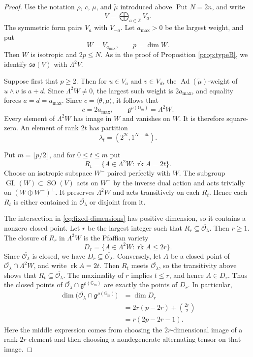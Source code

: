 \documentclass[10pt,a4paper]{amsart}
\DeclareMathOperator{\rk}{rk}
\newcommand{\Gm}{\mathbb G_m}
\begin{document}
\begin{proof}
Use the notation $\rho$, $c$, $\mu$, and $\widetilde{\mu}$ introduced
above. Put $N=2n$, and write
\[
V=\bigoplus_{a\in\mathbb Z}V_a.
\]
The symmetric form pairs $V_a$ with $V_{-a}$. Let $a_{\max}>0$ be the
largest weight, and put
\[
W=V_{a_{\max}},\qquad p=\dim W.
\]
Then $W$ is isotropic and $2p\leq N$. As in the proof of Proposition
\ref{prop:typeB}, we identify $\mathfrak{so}(V)$ with $\Lambda^2V$.

Suppose first that $p\geq2$. Then
for $u\in V_a$ and $v\in V_d$, the
$\operatorname{Ad}(\widetilde\mu)$-weight of $u\wedge v$ is $a+d$.
Since $\Lambda^2W\ne0$, the largest such weight is
$2a_{\max}$, and equality forces $a=d=a_{\max}$.
Since $c=\langle\theta,\mu\rangle$, it follows that
\[
c=2a_{\max},
\qquad
\mathfrak g^{\rho(\Gm)}=\Lambda^2W.
\]
Every element of $\Lambda^2W$ has image in $W$ and vanishes on $W$.
It is therefore square-zero. An element of rank $2t$ has partition
\[
\lambda_t=(2^{2t},1^{N-4t}).
\]

Put $m=\lfloor p/2\rfloor$, and for $0\leq t\leq m$ put
\[
R_t=\{A\in\Lambda^2W:\rk A=2t\}.
\]
Choose an isotropic subspace $W^-$ paired perfectly with $W$.
The subgroup $\operatorname{GL}(W)\subset\operatorname{SO}(V)$ acts
on $W^-$ by the inverse dual action and acts trivially on
$(W\oplus W^-)^\perp$. It preserves $\Lambda^2W$ and acts
transitively on each $R_t$. Hence each $R_t$ is either contained in
$\overline{\mathcal O_\lambda}$ or disjoint from it.

The intersection in \eqref{eq:fixed-dimensions} has positive
dimension, so it contains a nonzero closed point. Let $r$ be the
largest integer such that
$R_r\subseteq\overline{\mathcal O_\lambda}$. Then $r\geq1$.
The closure of $R_r$ in $\Lambda^2W$ is the Pfaffian variety
\[
D_r=\{A\in\Lambda^2W:\rk A\leq2r\}.
\]
Since $\overline{\mathcal O_\lambda}$ is closed, we have
$D_r\subseteq\overline{\mathcal O_\lambda}$. Conversely, let
$A$ be a closed point of
$\overline{\mathcal O_\lambda}\cap\Lambda^2W$, and write
$\rk A=2t$. Then $R_t$ meets $\overline{\mathcal O_\lambda}$, so the
transitivity above shows that
$R_t\subseteq\overline{\mathcal O_\lambda}$. The maximality of $r$
implies $t\leq r$, and hence $A\in D_r$. Thus the closed points of
$\overline{\mathcal O_\lambda}\cap\mathfrak g^{\rho(\Gm)}$ are
exactly the points of $D_r$. In particular,
\[
\begin{aligned}
\dim\bigl(\overline{\mathcal O_\lambda}
\cap\mathfrak g^{\rho(\Gm)}\bigr)
&=\dim D_r\\
&=2r(p-2r)+\binom{2r}{2}\\
&=r(2p-2r-1).
\end{aligned}
\]
Here the middle expression comes from choosing the $2r$-dimensional
image of a rank-$2r$ element and then choosing a nondegenerate
alternating tensor on that image.


\end{proof}
\end{document}
